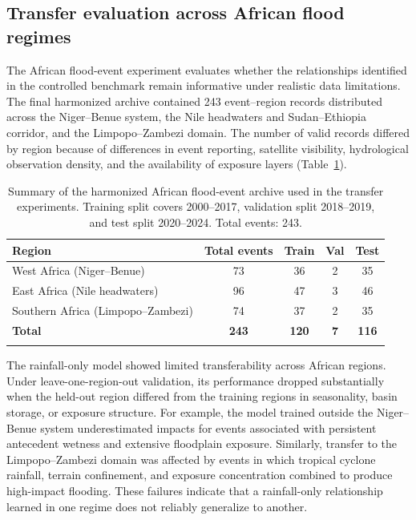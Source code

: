 \documentclass[pdflatex,sn-mathphys-ay]{sn-jnl}
\theoremstyle{thmstyleone}
\theoremstyle{thmstylethree}
\theoremstyle{thmstyletwo}
\begin{document}
\subsection{Transfer evaluation across African flood regimes}
\label{subsec:africa_transfer_results}

The African flood-event experiment evaluates whether the relationships
identified in the controlled benchmark remain informative under
realistic data limitations.  The final harmonized archive contained 243
event--region records distributed across the Niger--Benue system, the
Nile headwaters and Sudan--Ethiopia corridor, and the
Limpopo--Zambezi domain.  The number of valid records differed by
region because of differences in event reporting, satellite visibility,
hydrological observation density, and the availability of exposure
layers (Table~\ref{tab:africa_event_summary}).

\begin{table}[t]
\centering
\small
\caption{%
  Summary of the harmonized African flood-event archive used in the
  transfer experiments.  Training split covers 2000--2017, validation
  split 2018--2019, and test split 2020--2024.  Total events: 243.
}
\label{tab:africa_event_summary}
\begin{tabular}{lcccc}
\toprule
Region & Total events & Train & Val & Test \\
\midrule
West Africa (Niger--Benue)              & 73  & 36 & 2 & 35 \\
East Africa (Nile headwaters)           & 96  & 47 & 3 & 46 \\
Southern Africa (Limpopo--Zambezi)      & 74  & 37 & 2 & 35 \\
\midrule
\textbf{Total}                          & \textbf{243} & \textbf{120} & \textbf{7} & \textbf{116} \\
\botrule
\end{tabular}
\end{table}

The rainfall-only model showed limited transferability across African
regions.  Under leave-one-region-out validation, its performance
dropped substantially when the held-out region differed from the
training regions in seasonality, basin storage, or exposure structure.
For example, the model trained outside the Niger--Benue system
underestimated impacts for events associated with persistent antecedent
wetness and extensive floodplain exposure.  Similarly, transfer to the
Limpopo--Zambezi domain was affected by events in which tropical
cyclone rainfall, terrain confinement, and exposure concentration
combined to produce high-impact flooding.  These failures indicate that
a rainfall-only relationship learned in one regime does not reliably
generalize to another.
\end{document}
